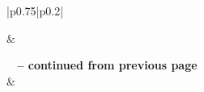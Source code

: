 \documentclass[acmsmall,screen,authorversion,nonacm]{acmart}
\begin{document}
\begin{center}
    \begin{longtable}{|p{0.75\linewidth}|p{0.2\linewidth}|}
    \caption{Participant 1 UI Navigation}
    \label{tab:SimpUser1Task1}
    
    \hline {} &  \\ \hline 
    \endfirsthead
    
    {{\bfseries \tablename\ \thetable{} -- continued from previous page}} \\
    \hline {} &  \\ \hline 
    \endhead
    
    \hline {} \\ \hline
    \endfoot
    
    \hline \hline
    \endlastfoot
    

\end{longtable}
\end{center}
\end{document}
